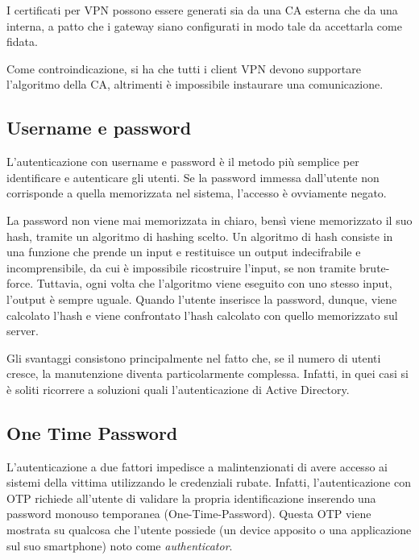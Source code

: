 I certificati per VPN possono essere generati sia da una CA esterna che da una interna, a patto che i gateway siano configurati in modo tale da accettarla come fidata.

Come controindicazione, si ha che tutti i client VPN devono supportare l'algoritmo della CA, altrimenti è impossibile instaurare una comunicazione.


\subsection{Username e password}

L'autenticazione con username e password è il metodo più semplice per identificare e autenticare gli utenti. Se la password immessa dall'utente non corrisponde a quella memorizzata nel sistema, l'accesso è ovviamente negato.

La password non viene mai memorizzata in chiaro, bensì viene memorizzato il suo hash, tramite un algoritmo di hashing scelto. Un algoritmo di hash consiste in una funzione che prende un input e restituisce un output indecifrabile e incomprensibile, da cui è impossibile ricostruire l'input, se non tramite brute-force. Tuttavia, ogni volta che l'algoritmo viene eseguito con uno stesso input, l'output è sempre uguale.
Quando l'utente inserisce la password, dunque, viene calcolato l'hash e viene confrontato l'hash calcolato con quello memorizzato sul server.

Gli svantaggi consistono principalmente nel fatto che, se il numero di utenti cresce, la manutenzione diventa particolarmente complessa. Infatti, in quei casi si è soliti ricorrere a soluzioni quali l'autenticazione di Active Directory.

\subsection{One Time Password}
L'autenticazione a due fattori impedisce a malintenzionati di avere accesso ai sistemi della vittima utilizzando le credenziali rubate. Infatti, l'autenticazione con OTP richiede all'utente di validare la propria identificazione inserendo una password monouso temporanea (One-Time-Password).
Questa OTP viene mostrata su qualcosa che l'utente possiede (un device apposito o una applicazione sul suo smartphone) noto come \emph{authenticator}.



